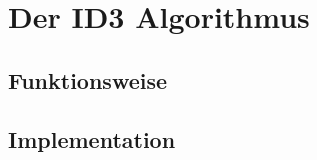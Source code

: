 \chapter{Der ID3 Algorithmus}
\label{id3}

\section{Funktionsweise}
\label{id3:funktionsweise}

\section{Implementation}
\label{id3:implementation}